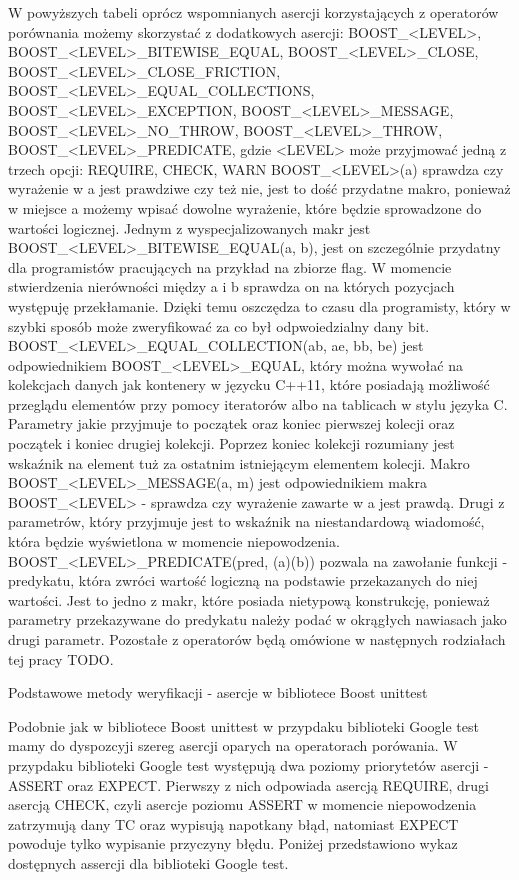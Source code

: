W powyższych tabeli oprócz wspomnianych asercji korzystających z operatorów porównania możemy skorzystać z dodatkowych asercji: BOOST_<LEVEL>, BOOST_<LEVEL>_BITEWISE_EQUAL, BOOST_<LEVEL>_CLOSE, BOOST_<LEVEL>_CLOSE_FRICTION, BOOST_<LEVEL>_EQUAL_COLLECTIONS, BOOST_<LEVEL>_EXCEPTION, BOOST_<LEVEL>_MESSAGE, BOOST_<LEVEL>_NO_THROW, BOOST_<LEVEL>_THROW, BOOST_<LEVEL>_PREDICATE, gdzie <LEVEL> może przyjmować jedną z trzech opcji: REQUIRE, CHECK, WARN
BOOST_<LEVEL>(a) sprawdza czy wyrażenie w a jest prawdziwe czy też nie, jest to dość przydatne makro, ponieważ w miejsce a możemy wpisać dowolne wyrażenie, które będzie sprowadzone do wartości logicznej.
Jednym z wyspecjalizowanych makr jest BOOST_<LEVEL>_BITEWISE_EQUAL(a, b), jest on szczególnie przydatny dla programistów pracujących na przykład na zbiorze flag. W momencie stwierdzenia nierówności między a i b sprawdza on na których pozycjach występuję przekłamanie. Dzięki temu oszczędza to czasu dla programisty, który w szybki sposób może zweryfikować za co był odpwoiedzialny dany bit.
BOOST_<LEVEL>_EQUAL_COLLECTION(ab, ae, bb, be) jest odpowiednikiem BOOST_<LEVEL>_EQUAL, który można wywołać na kolekcjach danych jak kontenery w języcku C++11, które posiadają możliwość przeglądu elementów przy pomocy iteratorów albo na tablicach w stylu języka C. Parametry jakie przyjmuje to początek oraz koniec pierwszej kolecji oraz początek i koniec drugiej kolekcji. Poprzez koniec kolekcji rozumiany jest wskaźnik na element tuż za ostatnim istniejącym elementem kolecji.
Makro BOOST_<LEVEL>_MESSAGE(a, m) jest odpowiednikiem makra BOOST_<LEVEL> - sprawdza czy wyrażenie zawarte w a jest prawdą. Drugi z parametrów, który przyjmuje jest to wskaźnik na niestandardową wiadomość, która będzie wyświetlona w momencie niepowodzenia.
BOOST_<LEVEL>_PREDICATE(pred, (a)(b)) pozwala na zawołanie funkcji - predykatu, która zwróci wartość logiczną na podstawie przekazanych do niej wartości. Jest to jedno z makr, które posiada nietypową konstrukcję, ponieważ parametry przekazywane do predykatu należy podać w okrągłych nawiasach jako drugi parametr.
Pozostałe z operatorów będą omówione w następnych rodziałach tej pracy TODO.

Podstawowe metody weryfikacji - asercje w bibliotece Boost unittest

Podobnie jak w bibliotece Boost unittest w przypdaku biblioteki Google test mamy do dyspozcyji szereg asercji oparych na operatorach porówania. W przypdaku biblioteki Google test występują dwa poziomy priorytetów asercji - ASSERT oraz EXPECT. Pierwszy z nich odpowiada asercją REQUIRE, drugi asercją CHECK, czyli asercje poziomu ASSERT w momencie niepowodzenia zatrzymują dany TC oraz wypisują napotkany błąd, natomiast EXPECT powoduje tylko wypisanie przyczyny błędu.
Poniżej przedstawiono wykaz dostępnych assercji dla biblioteki Google test.

